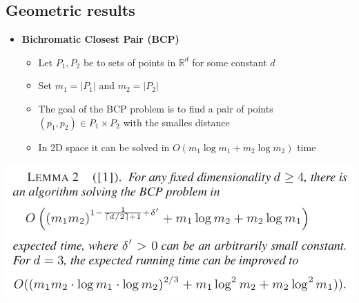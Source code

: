 \documentclass[11pt]{article}
\begin{document}
\subsection{Geometric results}
\label{sec:org916efdd}
\begin{itemize}
\item \textbf{Bichromatic Closest Pair (BCP)}
\begin{itemize}
\item Let \(P_1,P_2\) be to sets of points in \(\mathbb R ^d\) for some constant \(d\)
\item Set \(m_1 = | P_1 |\) and \(m_2 = |P_2|\)
\item The goal of the BCP problem is to find a pair of points \((p_1, p_2) \in P_1 \times P_2\) with the smalles distance
\item In 2D space it can be solved in \(O(m_1 \log m_1 + m_2 \log m_2)\) time
\end{itemize}
\end{itemize}
\begin{center}
\includegraphics[width=.9\linewidth]{DBSCAN Revisted/screenshot_2018-12-05_15-34-11.png}
\end{center}
\end{document}
